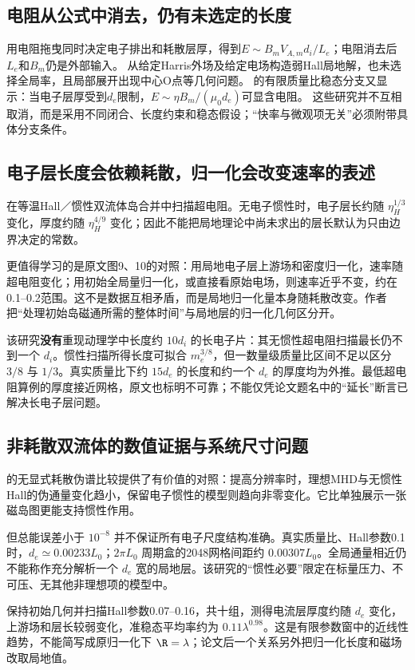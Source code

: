 \documentclass[UTF8,a4paper,11pt,openany,fontset=fandol]{ctexbook}
\begin{document}
\subsection{电阻从公式中消去，仍有未选定的长度}
\citet{L145}用电阻拖曳同时决定电子排出和耗散层厚，得到$E\sim B_mV_{\!A,m}d_i/L_e$；电阻消去后$L_e$和$B_m$仍是外部输入。
\citet{L137}从给定Harris外场及给定电场构造弱Hall局地解，也未选择全局率，且局部展开出现中心O点等几何问题。
\citet{L160}的有限质量比稳态分支又显示：当电子层厚受到$d_e$限制，$E\sim\eta B_m/(\mu_0d_e)$可显含电阻。
这些研究并不互相取消，而是采用不同闭合、长度约束和稳态假设；“快率与微观项无关”必须附带具体分支条件。

\subsection{电子层长度会依赖耗散，归一化会改变速率的表述}
\citet{Sullivan2009}在等温Hall／惯性双流体岛合并中扫描超电阻。无电子惯性时，电子层长约随 $\eta_H^{1/3}$ 变化，厚度约随 $\eta_H^{4/9}$ 变化；因此不能把局地理论中尚未求出的层长默认为只由边界决定的常数。

更值得学习的是原文图9、10的对照：用局地电子层上游场和密度归一化，速率随超电阻变化；用初始全局量归一化，或直接看原始电场，则速率近乎不变，约在0.1--0.2范围。这不是数据互相矛盾，而是局地归一化量本身随耗散改变。作者把“处理初始岛磁通所需的整体时间”与局地层的归一化几何区分开。

该研究\textbf{没有}重现动理学中长度约 $10d_i$ 的长电子片：其无惯性超电阻扫描最长仍不到一个 $d_i$。惯性扫描所得长度可拟合 $m_e^{3/8}$，但一数量级质量比区间不足以区分 $3/8$ 与 $1/3$。真实质量比下约 $15d_e$ 的长度和约一个 $d_e$ 的厚度均为外推。最低超电阻算例的厚度接近网格，原文也标明不可靠；不能仅凭论文题名中的“延长”断言已解决长电子层问题。

\subsection{非耗散双流体的数值证据与系统尺寸问题}
\citet{Andres2014}的无显式耗散伪谱比较提供了有价值的对照：提高分辨率时，理想MHD与无惯性Hall的伪通量变化趋小，保留电子惯性的模型则趋向非零变化。它比单独展示一张磁岛图更能支持惯性作用。

但总能误差小于 $10^{-8}$ 并不保证所有电子尺度结构准确。真实质量比、Hall参数0.1时，$d_e\simeq0.00233L_0$；$2\pi L_0$ 周期盒的2048网格间距约 $0.00307L_0$。全局通量相近仍不能称作充分解析一个 $d_e$ 宽的局地层。该研究的“惯性必要”限定在标量压力、不可压、无其他非理想项的模型中。

\citet{Andres2016}保持初始几何并扫描Hall参数0.07--0.16，共十组，测得电流层厚度约随 $d_e$ 变化，上游场和层长较弱变化，准稳态平均率约为 $0.11\lambda^{0.98}$。这是有限参数窗中的近线性趋势，不能简写成原归一化下 $\R=\lambda$；论文后一个关系另外把归一化长度和磁场改取局地值。
\end{document}
